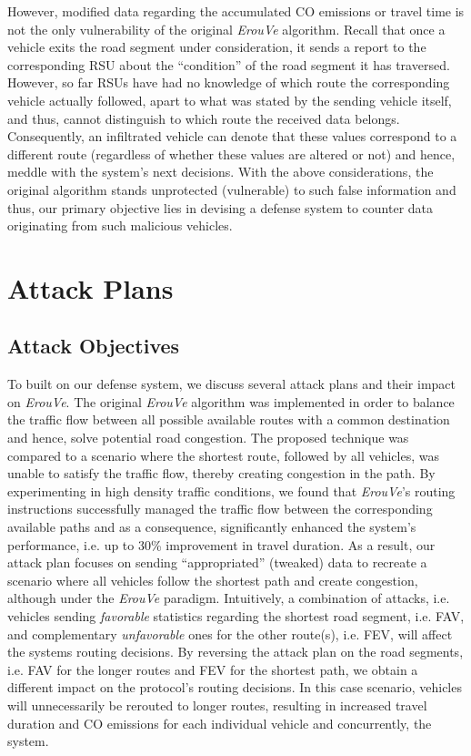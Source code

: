 \documentclass[conference]{IEEEtran}
\begin{document}
However, modified data regarding the accumulated CO emissions or travel time is not the only vulnerability of the original {\it ErouVe} algorithm.  Recall 
that once a vehicle exits the road segment under consideration, it sends a report  to the corresponding RSU about the ``condition'' of the road segment it has traversed.
However, so far RSUs have had no knowledge of which route the corresponding vehicle actually followed, apart to what was stated by the sending vehicle itself,
and thus, cannot distinguish to which route the received data belongs.  Consequently, an infiltrated vehicle can denote that these values correspond to a different route 
(regardless of whether these  values are altered or not) and hence, meddle with the system's next decisions.
With the above considerations, the original algorithm stands unprotected (vulnerable) to such false information and thus, our primary objective lies in devising a defense system
to counter data originating from such malicious vehicles.


\section{Attack Plans}
\label{attack-plan}

\subsection{Attack Objectives}

To built on our defense system, we discuss several attack plans and their impact on {\it ErouVe}. The original {\it ErouVe} algorithm
was implemented in order to balance the traffic flow between all possible available routes with a common destination and hence, solve 
potential road congestion. The proposed technique  was compared to a scenario where the shortest route, followed by all vehicles, 
was unable to satisfy the traffic flow, thereby creating congestion in the path. By experimenting in high density 
traffic conditions, we found that {\it ErouVe}'s routing instructions successfully managed the traffic flow between the 
corresponding available paths and as a consequence, significantly enhanced the system's performance, i.e. up to 30\% improvement in travel duration. 
As a result, our attack plan focuses on sending ``appropriated'' (tweaked) data to recreate a scenario where all vehicles follow the shortest
path and create congestion, although under the {\it ErouVe} paradigm. Intuitively, a combination of attacks, i.e. vehicles 
sending {\it favorable} statistics regarding the shortest road segment, i.e.  FAV, and complementary {\it unfavorable} ones for the other route(s), i.e.  FEV, 
will affect the systems routing decisions. By reversing the attack plan on the road segments, i.e. FAV for the longer routes and FEV for the shortest path, 
we obtain a different impact on the protocol's routing decisions. In this case scenario, vehicles will unnecessarily be rerouted to longer routes, resulting 
in increased travel duration and CO emissions for each individual vehicle and concurrently, the system. 
\end{document}

